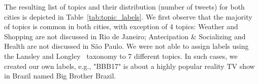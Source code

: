 





The resulting list of topics and their distribution (number of tweets) for both cities is depicted in Table~\ref{tab:topic_labels}. We first observe that the majority of topics is common in both cities, with exception of 4 topics:  Weather and Shopping are not discussed in Rio de Janeiro; Antecipation \& Socializing and Health are not discussed in São Paulo. We were not able to assign labels using the Lansley and Longley~\cite{lansley2016geography} taxonomy to 7 different topics. In such cases, we created our own labels, e.g., "BBB17" is about a highly popular reality TV show in Brazil named Big Brother Brazil. 

